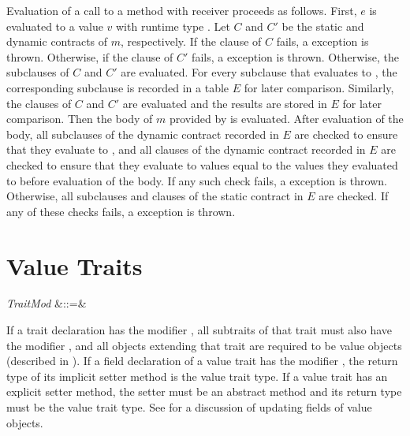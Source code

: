 Evaluation of a call to a method  with receiver 
proceeds as follows.
First, $e$ is evaluated to a value $v$ with runtime type .
Let $C$ and $C'$ be the static and dynamic contracts of $m$, respectively.
If the  clause of $C$ fails,
a  exception is thrown.
%
Otherwise, if the  clause of $C'$ fails,
a  exception is thrown.
%
Otherwise, the  subclauses of $C$ and $C'$ are evaluated. For
every  subclause that evaluates to , the
corresponding  subclause is recorded in a table
$E$ for later comparison.  Similarly, the  clauses of $C$
and $C'$ are evaluated and the results are stored in $E$ for later
comparison.
%
Then the body of $m$ provided by 
is evaluated.  After evaluation of the body,
all  subclauses of the dynamic contract recorded in $E$
are checked to ensure that they evaluate to , and
all  clauses of the dynamic contract recorded in $E$
are checked to ensure that they evaluate to values equal to the
values they evaluated to before evaluation of the body.
If any such check fails, a 
exception is thrown. Otherwise, all  subclauses and
 clauses of the static contract in $E$ are checked.
If any of these checks fails, a  exception
is thrown.


\section{Value Traits}

\begin{Grammar}
\emph{TraitMod} &::=& \\
\end{Grammar}


If a trait declaration has the modifier , all subtraits
of that trait must also have the modifier , and all objects
extending that trait are required to be value objects (described in
).
If a field declaration of a value trait has the modifier ,
the return type of its implicit setter method is the value trait type.
If a value trait has an explicit setter method, the setter must be an
abstract method and its return type must be the value trait type.
See  for a discussion of updating fields of value
objects.
